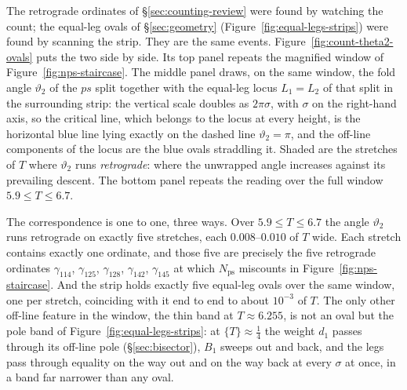 \documentclass[11pt]{article}
\theoremstyle{definition}
\begin{document}
The retrograde ordinates of \S\ref{sec:counting-review} were found by watching
the count; the equal-leg ovals of \S\ref{sec:geometry}
(Figure~\ref{fig:equal-legs-strips}) were found by scanning the strip. They
are the same events. Figure~\ref{fig:count-theta2-ovals} puts the two
side by side. Its top panel repeats the magnified window of
Figure~\ref{fig:nps-staircase}. The middle panel draws, on the same window,
the fold angle $\vartheta_2$ of the $ps$ split together with the equal-leg
locus $L_1=L_2$ of that split in the surrounding strip: the vertical scale
doubles as $2\pi\sigma$, with $\sigma$ on the right-hand axis, so the critical
line, which belongs to the locus at every height, is the horizontal blue line
lying exactly on the dashed line $\vartheta_2=\pi$, and the off-line
components of the locus are the blue ovals straddling it. Shaded are the
stretches of $T$ where $\vartheta_2$ runs \emph{retrograde}: where the
unwrapped angle increases against its prevailing descent. The bottom panel
repeats the reading over the full window $5.9\leq T\leq6.7$.

The correspondence is one to one, three ways. Over $5.9\leq T\leq6.7$ the
angle $\vartheta_2$ runs retrograde on exactly five stretches, each
$0.008$--$0.010$ of $T$ wide. Each stretch contains exactly one ordinate, and
those five are precisely the five retrograde ordinates $\gamma_{114}$,
$\gamma_{125}$, $\gamma_{128}$, $\gamma_{142}$, $\gamma_{145}$ at which
$N_{\mathrm{ps}}$ miscounts in Figure~\ref{fig:nps-staircase}. And the strip
holds exactly five equal-leg ovals over the same window, one per stretch,
coinciding with it end to end to about $10^{-3}$ of $T$. The only other
off-line feature in the window, the thin band at $T\approx6.255$, is not an
oval but the pole band of Figure~\ref{fig:equal-legs-strips}: at
$\{T\}\approx\tfrac14$ the weight $d_1$ passes through its off-line pole
(\S\ref{sec:bisector}), $B_1$ sweeps out and back, and the legs pass through
equality on the way out and on the way back at every $\sigma$ at once, in a
band far narrower than any oval.
\end{document}
